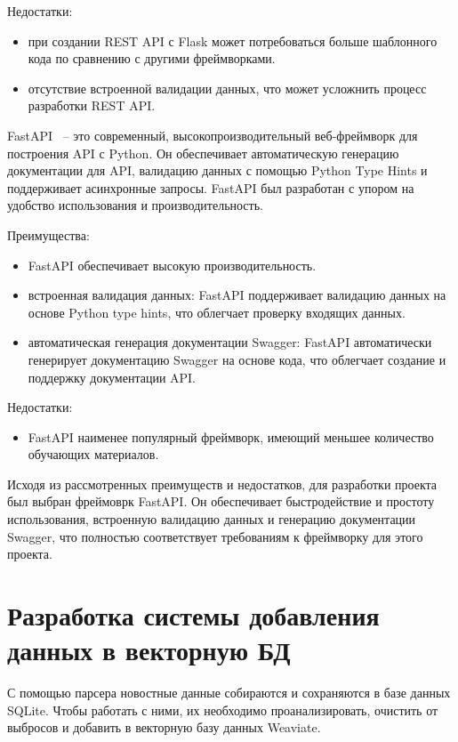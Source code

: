 Недостатки:
\begin{itemize}
    \item при создании REST API с Flask может потребоваться больше шаблонного кода по сравнению с другими фреймворками.
    \item отсутствие встроенной валидации данных, что может усложнить процесс разработки REST API.
\end{itemize}

FastAPI ~-- это современный, высокопроизводительный веб-фреймворк для построения API с Python. Он обеспечивает автоматическую генерацию документации для API, валидацию данных с помощью Python Type Hints и поддерживает асинхронные запросы. FastAPI был разработан с упором на удобство использования и производительность.

Преимущества:
\begin{itemize}
    \item FastAPI обеспечивает высокую производительность.
    \item встроенная валидация данных: FastAPI поддерживает валидацию данных на основе Python type hints, что облегчает проверку входящих данных.
    \item автоматическая генерация документации Swagger: FastAPI автоматически генерирует документацию Swagger на основе кода, что облегчает создание и поддержку документации API.
\end{itemize}

Недостатки:
\begin{itemize}
    \item FastAPI наименее популярный фреймворк, имеющий меньшее количество обучающих материалов.
\end{itemize}

Исходя из рассмотренных преимуществ и недостатков, для разработки проекта был выбран фреймоврк FastAPI. Он обеспечивает быстродействие и простоту использования, встроенную валидацию данных и генерацию документации Swagger, что полностью соответствует требованиям к фреймворку для этого проекта.

\section{Разработка системы добавления данных в векторную БД}

С помощью парсера новостные данные собираются и сохраняются в базе данных SQLite. Чтобы работать с ними, их необходимо проанализировать, очистить от выбросов и добавить в векторную базу данных Weaviate.

